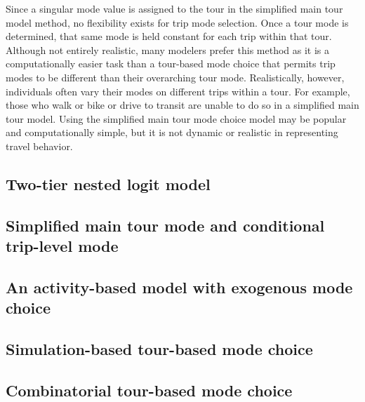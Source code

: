\documentclass[12pt, oneside, openright]{byuthesis}
\begin{document}
Since a singular mode value is assigned to the tour in the simplified main tour model method, no flexibility exists for trip mode selection. Once a tour mode is determined, that same mode is held constant for each trip within that tour. Although not entirely realistic, many modelers prefer this method as it is a computationally easier task than a tour-based mode choice that permits trip modes to be different than their overarching tour mode. Realistically, however, individuals often vary their modes on different trips within a tour. For example, those who walk or bike or drive to transit are unable to do so in a simplified main tour model. Using the simplified main tour mode choice model may be popular and computationally simple, but it is not dynamic or realistic in representing travel behavior.

\hypertarget{two-tier-nested-logit-model}{%
\subsection{Two-tier nested logit model}\label{two-tier-nested-logit-model}}

\hypertarget{simplified-main-tour-mode-and-conditional-trip-level-mode}{%
\subsection{Simplified main tour mode and conditional trip-level mode}\label{simplified-main-tour-mode-and-conditional-trip-level-mode}}

\hypertarget{an-activity-based-model-with-exogenous-mode-choice}{%
\subsection{An activity-based model with exogenous mode choice}\label{an-activity-based-model-with-exogenous-mode-choice}}

\hypertarget{simulation-based-tour-based-mode-choice}{%
\subsection{Simulation-based tour-based mode choice}\label{simulation-based-tour-based-mode-choice}}

\hypertarget{combinatorial-tour-based-mode-choice}{%
\subsection{Combinatorial tour-based mode choice}\label{combinatorial-tour-based-mode-choice}}
\end{document}
